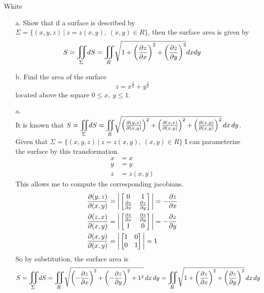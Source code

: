\documentclass[titlepage]{article}
\begin{document}
\begin{cproblem}{2}{White}
\phantom{-}\\
\vspace{-1em}
\begin{itemize}
\item[a.]
Show that if a surface is described by $\Sigma = \{(x,y,z)\ | \ z= z(x,y), \ (x,y) \in R\}$, then the surface area is given by
$$S  = \bigiint{\Sigma}{}dS = \bigiint{R}{}\sqrt{1+\left(\frac{\p z}{\p x}\right)^2 + \left(\frac{\p z}{\p y}\right)^2}dxdy$$
\item[b.]Find the area of the surface
$$z = x^\frac{3}{2} + y^\frac{3}{2}$$
located above the square $0 \leq x, \ y\leq 1.$
\end{itemize}
\end{cproblem}
\begin{solution}
\begin{itemize}
\vspace{-2em}
\item[a.] \phantom{-} \\
It is known that $S = \bigiint{\Sigma}{}dS = \bigiint{R}{}\sqrt{\left(\frac{\p (y,z)}{\p(x,y)}\right)^2 + \left(\frac{\p (z,x)}{\p (x,y)}\right)^2 + \left(\frac{\p (x,y)}{\p (x,y)}\right)^2}\,dx\,dy$. \\Given that $\Sigma = \{(x,y,z)\ | \ z= z(x,y), \ (x,y) \in R\}$ I can parameterize the surface by this transformation. 
\begin{align*}
x &= x \\
y &= y \\
z &= z(x,y)
\end{align*}
This allows me to compute the corresponding jacobians.
\begin{align*}
\frac{\p(y,z)}{\p(x,y)} &= \bigg|\bmat{0 & 1 \\ \frac{\p z}{\p x} & \frac{\p z}{\p y}} \bigg| = -\frac{\p z}{\p x}\\
\frac{\p(z,x)}{\p(x,y)} &= \bigg|\bmat{\frac{\p z}{\p x} & \frac{\p z}{\p y} \\ 1 & 0} \bigg| = -\frac{\p z}{\p y}\\ 
\frac{\p(x,y)}{\p(x,y)} &= \bigg|\bmat{1 & 0 \\ 0 & 1} \bigg| = 1\\
\end{align*}
So by substitution, the surface area is
$$S = \bigiint{\Sigma}{}dS = \bigiint{R}{}\sqrt{\left( -\frac{\p z}{\p x}\right)^2 + \left(-\frac{\p z}{\p y}\right)^2 + 1^2}\,dx\,dy = \bigiint{R}{}\sqrt{1+\left(\frac{\p z}{\p x}\right)^2 + \left(\frac{\p z}{\p y}\right)^2}\,dx\,dy$$

\end{itemize}
\end{solution}
\end{document}
